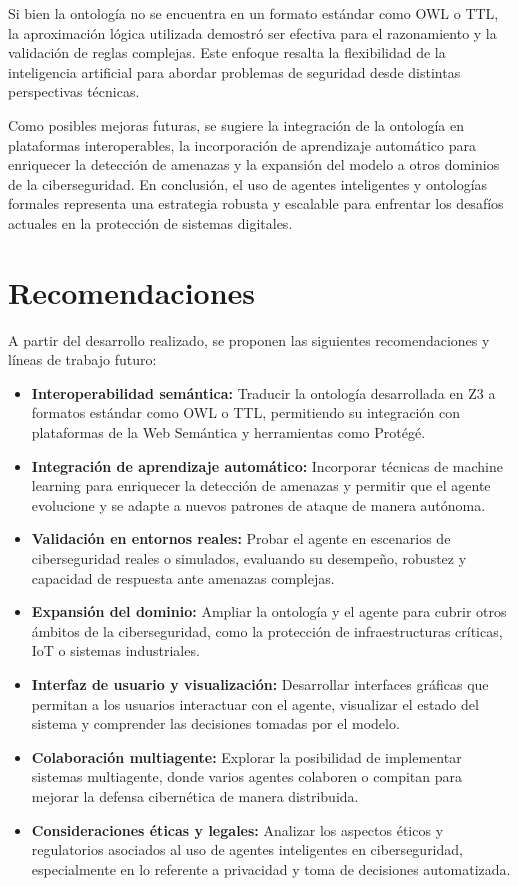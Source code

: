 \documentclass[letterpaper, 12pt]{article}
\begin{document}
Si bien la ontología no se encuentra en un formato estándar como OWL o TTL, la aproximación lógica utilizada demostró ser efectiva para el razonamiento y la validación de reglas complejas. Este enfoque resalta la flexibilidad de la inteligencia artificial para abordar problemas de seguridad desde distintas perspectivas técnicas.

Como posibles mejoras futuras, se sugiere la integración de la ontología en plataformas interoperables, la incorporación de aprendizaje automático para enriquecer la detección de amenazas y la expansión del modelo a otros dominios de la ciberseguridad. En conclusión, el uso de agentes inteligentes y ontologías formales representa una estrategia robusta y escalable para enfrentar los desafíos actuales en la protección de sistemas digitales.

\section*{Recomendaciones}
A partir del desarrollo realizado, se proponen las siguientes recomendaciones y líneas de trabajo futuro:

\begin{itemize}
    \item \textbf{Interoperabilidad semántica:} Traducir la ontología desarrollada en Z3 a formatos estándar como OWL o TTL, permitiendo su integración con plataformas de la Web Semántica y herramientas como Protégé.
    \item \textbf{Integración de aprendizaje automático:} Incorporar técnicas de machine learning para enriquecer la detección de amenazas y permitir que el agente evolucione y se adapte a nuevos patrones de ataque de manera autónoma.
    \item \textbf{Validación en entornos reales:} Probar el agente en escenarios de ciberseguridad reales o simulados, evaluando su desempeño, robustez y capacidad de respuesta ante amenazas complejas.
    \item \textbf{Expansión del dominio:} Ampliar la ontología y el agente para cubrir otros ámbitos de la ciberseguridad, como la protección de infraestructuras críticas, IoT o sistemas industriales.
    \item \textbf{Interfaz de usuario y visualización:} Desarrollar interfaces gráficas que permitan a los usuarios interactuar con el agente, visualizar el estado del sistema y comprender las decisiones tomadas por el modelo.
    \item \textbf{Colaboración multiagente:} Explorar la posibilidad de implementar sistemas multiagente, donde varios agentes colaboren o compitan para mejorar la defensa cibernética de manera distribuida.
    \item \textbf{Consideraciones éticas y legales:} Analizar los aspectos éticos y regulatorios asociados al uso de agentes inteligentes en ciberseguridad, especialmente en lo referente a privacidad y toma de decisiones automatizada.
\end{itemize}
\end{document}
